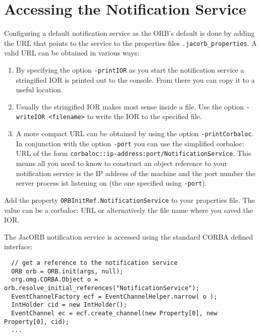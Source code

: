 \section{Accessing the Notification Service}
\label{sec:access-notif-serv}

Configuring a default notification service as the ORB's default is done
by adding the URL that points to the service to the properties files
\texttt{.jacorb\_properties}. A valid URL can be obtained in various ways:

\begin{enumerate}
\item By specifying the option \texttt{-printIOR} as you start the
  notification service a stringified IOR is printed out to the
  console. From there you can copy it to a useful location.

\item Usually the stringified IOR makes most sense inside a file. Use
  the option \texttt{-writeIOR <filename>} to write the IOR to the specified
  file.

\item A more compact URL can be obtained by using the
  option \texttt{-printCorbaloc}. In conjunction with the option
  \texttt{-port} you can use the simplified corbaloc: URL of the form
  \texttt{corbaloc::ip-address:port/NotificationService}. This means
  all you need to know to construct an object reference to your
  notification service is the IP address of the machine and the port
  number the server process ist listening on (the one specified using
  \texttt{-port}). 

\end{enumerate}

Add the property \texttt{ORBInitRef.NotificationService} to your
properties file. The value can be a corbaloc: URL or alternatively the
file name where you saved the IOR.

The JacORB notification service is accessed using the standard CORBA
defined interface:

\small{
\begin{verbatim}
  // get a reference to the notification service
  ORB orb = ORB.init(args, null);
  org.omg.CORBA.Object o = orb.resolve_initial_references("NotificationService");
  EventChannelFactory ecf = EventChannelHelper.narrow( o );
  IntHolder cid = new IntHolder();
  EventChannel ec = ecf.create_channel(new Property[0], new Property[0], cid);
  ...
\end{verbatim}
}

